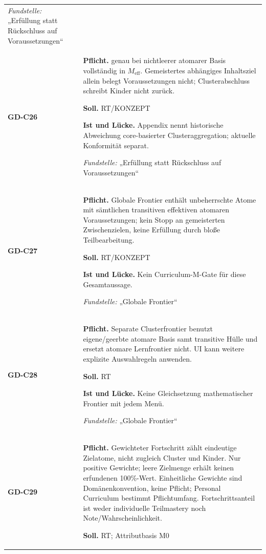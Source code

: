 \begin{longtable}{@{}P{20mm}P{128mm}@{}}
\emph{Fundstelle:} „Erfüllung statt Rückschluss auf Voraussetzungen“\\\addlinespace[5pt]
\label{rule:GD-C26}\textbf{GD-C26} &
\textbf{Pflicht.}  genau bei nichtleerer atomarer Basis vollständig in \(M_{\mathrm{eff}}\). Gemeistertes abhängiges Inhaltsziel allein belegt Voraussetzungen nicht; Clusterabschluss schreibt Kinder nicht zurück.\par\smallskip
\textbf{Soll.} RT/KONZEPT\par\smallskip
\textbf{Ist und Lücke.} Appendix nennt historische Abweichung core-basierter Clusteraggregation; aktuelle Konformität separat.\par\smallskip
\emph{Fundstelle:} „Erfüllung statt Rückschluss auf Voraussetzungen“\\\addlinespace[5pt]
\label{rule:GD-C27}\textbf{GD-C27} &
\textbf{Pflicht.} Globale Frontier enthält unbeherrschte Atome mit sämtlichen transitiven effektiven atomaren Voraussetzungen; kein Stopp an gemeisterten Zwischenzielen, keine Erfüllung durch bloße Teilbearbeitung.\par\smallskip
\textbf{Soll.} RT/KONZEPT\par\smallskip
\textbf{Ist und Lücke.} Kein Curriculum-M-Gate für diese Gesamtaussage.\par\smallskip
\emph{Fundstelle:} „Globale Frontier“\\\addlinespace[5pt]
\label{rule:GD-C28}\textbf{GD-C28} &
\textbf{Pflicht.} Separate Clusterfrontier benutzt eigene/geerbte atomare Basis samt transitive Hülle und ersetzt atomare Lernfrontier nicht. UI kann weitere explizite Auswahlregeln anwenden.\par\smallskip
\textbf{Soll.} RT\par\smallskip
\textbf{Ist und Lücke.} Keine Gleichsetzung mathematischer Frontier mit jedem Menü.\par\smallskip
\emph{Fundstelle:} „Globale Frontier“\\\addlinespace[5pt]
\label{rule:GD-C29}\textbf{GD-C29} &
\textbf{Pflicht.} Gewichteter Fortschritt zählt eindeutige Zielatome, nicht zugleich Cluster und Kinder. Nur positive Gewichte; leere Zielmenge erhält keinen erfundenen 100\%-Wert. Einheitliche Gewichte sind Domänenkonvention, keine Pflicht; Personal Curriculum bestimmt Pflichtumfang. Fortschrittsanteil ist weder individuelle Teilmastery noch Note/Wahrscheinlichkeit.\par\smallskip
\textbf{Soll.} RT; Attributbasis M0\par\smallskip

\end{longtable}

